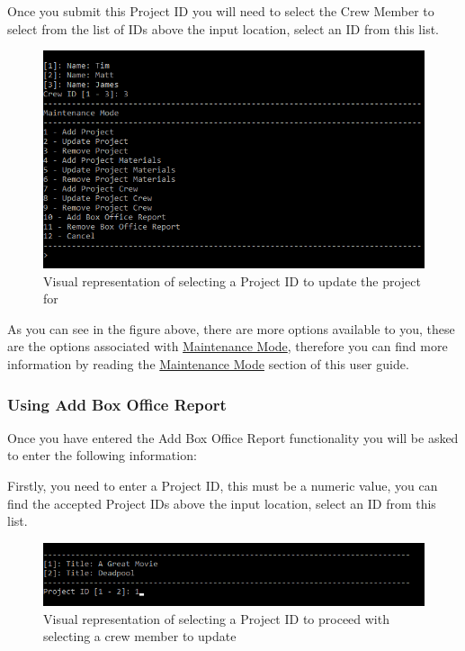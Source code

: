 \documentclass[
  english,
  a4paper,
,tablecaptionabove
]{scrartcl}
\begin{document}
Once you submit this Project ID you will need to select the Crew Member
to select from the list of IDs above the input location, select an ID
from this list.

\begin{figure}
\centering
\includegraphics{images/user-guide/maintenance-mode/remove-crew-select-id.png}
\caption{Visual representation of selecting a Project ID to update the
project for}
\end{figure}

As you can see in the figure above, there are more options available to
you, these are the options associated with
\protect\hyperlink{using-maintenance-mode}{Maintenance Mode}, therefore
you can find more information by reading the
\protect\hyperlink{using-maintenance-mode}{Maintenance Mode} section of
this user guide.

\newpage

\hypertarget{using-add-box-office-report}{%
\subsubsection{Using Add Box Office
Report}\label{using-add-box-office-report}}

Once you have entered the Add Box Office Report functionality you will
be asked to enter the following information:

Firstly, you need to enter a Project ID, this must be a numeric value,
you can find the accepted Project IDs above the input location, select
an ID from this list.

\begin{figure}
\centering
\includegraphics{images/user-guide/maintenance-mode/update-project-select-id.png}
\caption{Visual representation of selecting a Project ID to proceed with
selecting a crew member to update}
\end{figure}
\end{document}
